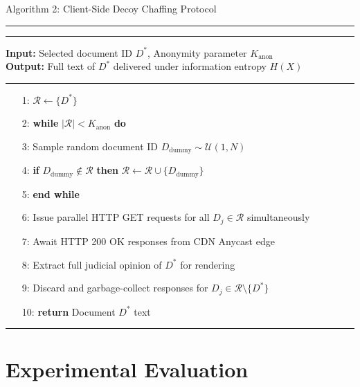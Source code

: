 \documentclass[11pt,journal,compsoc,onecolumn]{IEEEtran}
\begin{document}
\begin{table}[H]
\centering
\caption{Algorithm 2: Client-Side Decoy Chaffing Protocol}
\label{alg:chaffing}
\begin{minipage}{0.88\textwidth}
\hrule \vspace{3pt} \hrule \vspace{4pt}
\small
\textbf{Input:} Selected document ID $D^*$, Anonymity parameter $K_{\text{anon}}$\\
\textbf{Output:} Full text of $D^*$ delivered under information entropy $H(X)$
\vspace{3pt} \hrule \vspace{4pt}
\begin{enumerate}
    \item[1:] $\mathcal{R} \leftarrow \{D^*\}$
    \item[2:] \textbf{while} $|\mathcal{R}| < K_{\text{anon}}$ \textbf{do}
    \item[3:] \quad Sample random document ID $D_{\text{dummy}} \sim \mathcal{U}(1, N)$
    \item[4:] \quad \textbf{if} $D_{\text{dummy}} \notin \mathcal{R}$ \textbf{then} $\mathcal{R} \leftarrow \mathcal{R} \cup \{D_{\text{dummy}}\}$
    \item[5:] \textbf{end while}
    \item[6:] Issue parallel HTTP GET requests for all $D_j \in \mathcal{R}$ simultaneously
    \item[7:] Await HTTP 200 OK responses from CDN Anycast edge
    \item[8:] Extract full judicial opinion of $D^*$ for rendering
    \item[9:] Discard and garbage-collect responses for $D_j \in \mathcal{R} \setminus \{D^*\}$
    \item[10:] \textbf{return} Document $D^*$ text
\end{enumerate}
\vspace{3pt} \hrule
\end{minipage}
\end{table}

\section{Experimental Evaluation}
\end{document}
